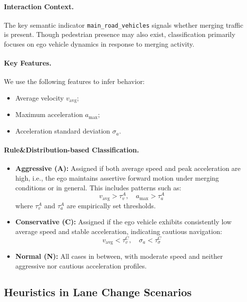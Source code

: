 \documentclass{article}
\begin{document}
\paragraph{Interaction Context.}
The key semantic indicator \texttt{main\_road\_vehicles} signals whether merging traffic is present. Though pedestrian presence may also exist, classification primarily focuses on ego vehicle dynamics in response to merging activity.

\paragraph{Key Features.}
We use the following features to infer behavior:
\begin{itemize}[leftmargin=1em, topsep=0pt, itemsep=0.3em]
    \item Average velocity $v_{\text{avg}}$;
    \item Maximum acceleration $a_{\max}$;
    \item Acceleration standard deviation $\sigma_a$.
\end{itemize}

\paragraph{Rule\&Distribution-based Classification.}
\begin{itemize}[leftmargin=1em, topsep=0pt, itemsep=0.3em]
    \item \textbf{Aggressive (A):} Assigned if both average speed and peak acceleration are high, i.e., the ego maintains assertive forward motion under merging conditions or in general. This includes patterns such as:
    \[
    v_{\text{avg}} > \tau_v^{A}, \quad a_{\max} > \tau_a^{A}
    \]
    where $\tau_v^{A}$ and $\tau_a^{A}$ are empirically set thresholds.

    \item \textbf{Conservative (C):} Assigned if the ego vehicle exhibits consistently low average speed and stable acceleration, indicating cautious navigation:
    \[
    v_{\text{avg}} < \tau_v^{C}, \quad \sigma_a < \tau_\sigma^{C}
    \]

    \item \textbf{Normal (N):} All cases in between, with moderate speed and neither aggressive nor cautious acceleration profiles.
\end{itemize}




\subsection{Heuristics in Lane Change Scenarios}
\end{document}
